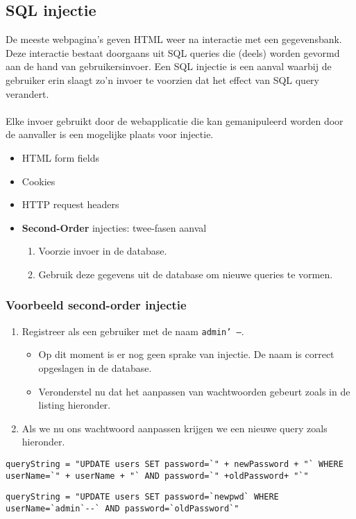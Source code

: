\documentclass[../main.tex]{subfiles}
\begin{document}
\subsection{SQL injectie}
De meeste webpagina's geven HTML weer na interactie met een gegevensbank. Deze interactie bestaat doorgaans uit SQL queries die (deels) worden gevormd aan de hand van gebruikersinvoer. Een SQL injectie is een aanval waarbij de gebruiker erin slaagt zo'n invoer te voorzien dat het effect van SQL query verandert. 
\\\\
Elke invoer gebruikt door de webapplicatie die kan gemanipuleerd worden door de aanvaller is een mogelijke plaats voor injectie.
\begin{itemize}
	\item HTML form fields
	\item Cookies
	\item HTTP request headers
	\item \textbf{Second-Order} injecties: twee-fasen aanval
	\begin{enumerate}
		\item Voorzie invoer in de database.
		\item Gebruik deze gegevens uit de database om nieuwe queries te vormen.	
	\end{enumerate}
\end{itemize}

\subsubsection{Voorbeeld second-order injectie}
\begin{enumerate}
	\item Registreer als een gebruiker met de naam \texttt{admin' --}.
	\begin{itemize}
		\item Op dit moment is er nog geen sprake van injectie. De naam is correct opgeslagen in de database.
		\item Veronderstel nu dat het aanpassen van wachtwoorden gebeurt zoals in de listing hieronder.
	\end{itemize}
	\item Als we nu ons wachtwoord aanpassen krijgen we een nieuwe query zoals hieronder.
\end{enumerate}
\begin{lstlisting}[caption=Updaten wachtwoord]
queryString = "UPDATE users SET password=`" + newPassword + "` WHERE userName=`" + userName + "` AND password=`" +oldPassword+ "`"
\end{lstlisting}
\begin{lstlisting}[caption=SQL Injection]
queryString = "UPDATE users SET password=`newpwd` WHERE userName=`admin`--` AND password=`oldPassword`"
\end{lstlisting}
\end{document}
